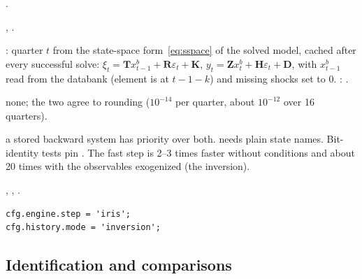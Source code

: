 \documentclass[11pt,a4paper]{article}
\DeclareRobustCommand{\codem}[1]{\texttt{\detokenize{#1}}}
\newenvironment{optspec}%
  {\begin{description}[style=sameline,leftmargin=2.7cm,labelwidth=2.5cm,font=\normalfont\itshape]}%
  {\end{description}}
\newcommand{\T}{\mathbf{T}}
\newcommand{\K}{\mathbf{K}}
\newcommand{\Rs}{\mathbf{R}}
\newcommand{\Z}{\mathbf{Z}}
\newcommand{\Hs}{\mathbf{H}}
\newcommand{\D}{\mathbf{D}}
\begin{document}
\subsubsection{\texorpdfstring{\codem{engine.step}}{engine.step}}\label{opt:engine-step}
\begin{optspec}
  \item[Default] .
  \item[Values] , .
  \item[Math] : quarter $t$ from the state-space form~\eqref{eq:sspace} of the solved
        model, cached after every successful solve:
        $\xi_t = \T x^b_{t-1} + \Rs\varepsilon_t + \K$, $y_t = \Z x^b_t + \Hs\varepsilon_t + \D$,
        with $x^b_{t-1}$ read from the databank (element  is  at $t-1-k$) and
        missing shocks set to 0. : .
  \item[Assumptions] none; the two agree to rounding ($10^{-14}$ per quarter, about $10^{-12}$
        over 16 quarters).
  \item[Interactions] a stored backward system has priority over both.  needs plain
        state names. Bit-identity tests pin . The fast step is 2--3 times faster
        without conditions and about 20 times with the observables exogenized (the inversion).
  \item[Code] , , .
  \item[Example]
\begin{lstlisting}
cfg.engine.step = 'iris';
cfg.history.mode = 'inversion';
\end{lstlisting}
\end{optspec}

\subsection{Identification and comparisons}
\end{document}
